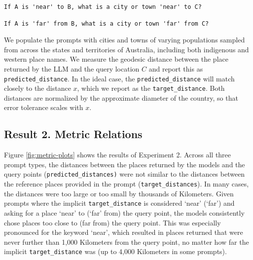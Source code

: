 \begin{lstlisting}[title=Prompt 4: `Near' Metric Prompt]
    If A is 'near' to B, what is a city or town 'near' to C?
\end{lstlisting}

\begin{lstlisting}[title=Prompt 5: `Far' Metric Prompt]
    If A is 'far' from B, what is a city or town 'far' from C?
\end{lstlisting}



\noindent We populate the prompts with cities and towns of varying populations sampled from across the states and territories of Australia, including both indigenous and western place names.
We measure the geodesic distance between the place returned by the LLM and the query location $C$ and report this as \texttt{predicted{\_}distance}.
In the ideal case, the \texttt{predicted{\_}distance} will match closely to the distance $x$, which we report as the \texttt{target{\_}distance}.
Both distances are normalized by the approximate diameter of the country, so that error tolerance scales with $x$.



\subsection{Result 2. Metric Relations}

Figure \ref{fig:metric-plots} shows the results of Experiment 2.
Across all three prompt types, the distances between the places returned by the models and the query points (\texttt{predicted{\_}distances)} were not similar to the distances between the reference places provided in the prompt (\texttt{target{\_}distances}).
In many cases, the distances were too large or too small by thousands of Kilometers.
%
Given prompts where the implicit \texttt{target{\_}distance} is considered `near' (`far') and asking for a place `near' to (`far' from) the query point, the models consistently chose places too close to (far from) the query point.
This was especially pronounced for the keyword `near', which resulted in places returned that were never further than 1,000 Kilometers from the query point, no matter how far the implicit \texttt{target{\_}distance} was (up to 4,000 Kilometers in some prompts).



